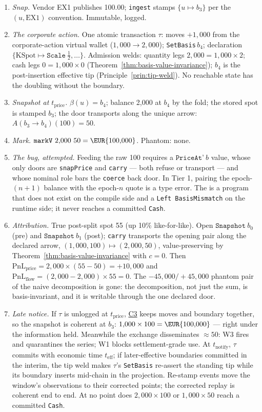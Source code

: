 \begin{enumerate}[nosep]
\item \emph{Snap.} Vendor EX1 publishes 100.00; \texttt{ingest} stamps
$\{u\mapsto b_3\}$ per the $(u,\mathrm{EX1})$ convention. Immutable, logged.
\item \emph{The corporate action.} One atomic transaction $\tau$: moves $+1{,}000$ from
the corporate-action virtual wallet ($1{,}000\to2{,}000$); \texttt{SetBasis}\,$b_4$;
declaration $\{\mathrm{KSpot}\mapsto\texttt{Scale}\ \tfrac12,\dots\}$. Admission welds:
quantity legs $2{,}000=1{,}000\times2$; cash legs $0=1{,}000\times0$
(Theorem~\ref{thm:basis-value-invariance}); $b_4$ is the post-insertion effective tip
(Principle~\ref{prin:tip-weld}). No reachable state has the doubling without the
boundary.
\item \emph{Snapshot at $t_{\mathrm{price}}$.} $\beta(u)=b_4$; balance 2{,}000 at $b_4$
by the fold; the stored spot is stamped $b_3$; the door transports along the unique
arrow: $A(b_3\to b_4)(100)=50$.
\item \emph{Mark.} $\texttt{markV}\ 2{,}000\ 50=\EUR{100{,}000}$. Phantom: none.
\item \emph{The bug, attempted.} Feeding the raw 100 requires a
$\texttt{PriceAt'}\ b$ value, whose only doors are \texttt{snapPrice} and \texttt{carry}
--- both refuse or transport --- and whose nominal role bars the \texttt{coerce} back
door. In Tier 1, pairing the epoch-$(n{+}1)$ balance with the epoch-$n$ quote is a type
error. The  is a program that does not exist on the compile side and a
\texttt{Left BasisMismatch} on the runtime side; it never reaches a committed
\texttt{Cash}.
\item \emph{Attribution.} True post-split spot 55 (up 10\% like-for-like). Open
$\texttt{Snapshot}\ b_0$ (pre) and $\texttt{Snapshot}\ b_1$ (post); \texttt{carry}
transports the opening pair along the declared arrow, $(1{,}000,100)\mapsto(2{,}000,50)$,
value-preserving by Theorem~\ref{thm:basis-value-invariance} with $c=0$. Then
$\mathrm{PnL}_{\text{price}}=2{,}000\times(55-50)=+10{,}000$ and
$\mathrm{PnL}_{\text{flow}}=(2{,}000-2{,}000)\times55=0$. The $-45{,}000/+45{,}000$
phantom pair of the naive decomposition is gone: the decomposition, not just the sum, is
basis-invariant, and it is writable through the one declared door.
\item \emph{Late notice.} If $\tau$ is unlogged at $t_{\mathrm{price}}$,
\hyperref[cond:C3]{C3} keeps moves and boundary together, so the snapshot is coherent at
$b_3$: $1{,}000\times100=\EUR{100{,}000}$ --- right under the information held.
Meanwhile the exchange disseminates $\approx50$: W3 fires and quarantines the series; W1
blocks settlement-grade use. At $t_{\mathrm{notify}}$, $\tau$ commits with economic time
$t_{\mathrm{eff}}$; if later-effective boundaries committed in the interim, the tip weld
makes $\tau$'s \texttt{SetBasis} re-assert the standing tip while its boundary inserts
mid-chain in the projection. Re-stamp events move the window's observations to their
corrected points; the corrected replay is coherent end to end. At no point does
$2{,}000\times100$ or $1{,}000\times50$ reach a committed \texttt{Cash}.
\end{enumerate}

